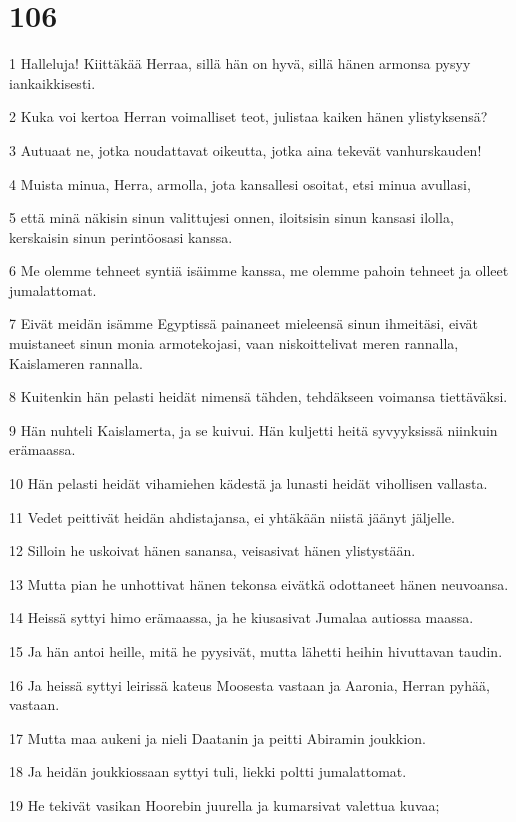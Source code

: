 \chapter{106}

\par 1 Halleluja! Kiittäkää Herraa, sillä hän on hyvä, sillä hänen armonsa pysyy iankaikkisesti.
\par 2 Kuka voi kertoa Herran voimalliset teot, julistaa kaiken hänen ylistyksensä?
\par 3 Autuaat ne, jotka noudattavat oikeutta, jotka aina tekevät vanhurskauden!
\par 4 Muista minua, Herra, armolla, jota kansallesi osoitat, etsi minua avullasi,
\par 5 että minä näkisin sinun valittujesi onnen, iloitsisin sinun kansasi ilolla, kerskaisin sinun perintöosasi kanssa.
\par 6 Me olemme tehneet syntiä isäimme kanssa, me olemme pahoin tehneet ja olleet jumalattomat.
\par 7 Eivät meidän isämme Egyptissä painaneet mieleensä sinun ihmeitäsi, eivät muistaneet sinun monia armotekojasi, vaan niskoittelivat meren rannalla, Kaislameren rannalla.
\par 8 Kuitenkin hän pelasti heidät nimensä tähden, tehdäkseen voimansa tiettäväksi.
\par 9 Hän nuhteli Kaislamerta, ja se kuivui. Hän kuljetti heitä syvyyksissä niinkuin erämaassa.
\par 10 Hän pelasti heidät vihamiehen kädestä ja lunasti heidät vihollisen vallasta.
\par 11 Vedet peittivät heidän ahdistajansa, ei yhtäkään niistä jäänyt jäljelle.
\par 12 Silloin he uskoivat hänen sanansa, veisasivat hänen ylistystään.
\par 13 Mutta pian he unhottivat hänen tekonsa eivätkä odottaneet hänen neuvoansa.
\par 14 Heissä syttyi himo erämaassa, ja he kiusasivat Jumalaa autiossa maassa.
\par 15 Ja hän antoi heille, mitä he pyysivät, mutta lähetti heihin hivuttavan taudin.
\par 16 Ja heissä syttyi leirissä kateus Moosesta vastaan ja Aaronia, Herran pyhää, vastaan.
\par 17 Mutta maa aukeni ja nieli Daatanin ja peitti Abiramin joukkion.
\par 18 Ja heidän joukkiossaan syttyi tuli, liekki poltti jumalattomat.
\par 19 He tekivät vasikan Hoorebin juurella ja kumarsivat valettua kuvaa;
